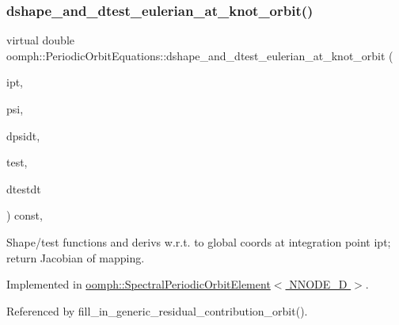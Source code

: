 \subsubsection{\texorpdfstring{dshape\+\_\+and\+\_\+dtest\+\_\+eulerian\+\_\+at\+\_\+knot\+\_\+orbit()}{dshape\_and\_dtest\_eulerian\_at\_knot\_orbit()}}
{\footnotesize\ttfamily virtual double oomph\+::\+Periodic\+Orbit\+Equations\+::dshape\+\_\+and\+\_\+dtest\+\_\+eulerian\+\_\+at\+\_\+knot\+\_\+orbit (\begin{DoxyParamCaption}\item[{const unsigned \&}]{ipt,  }\item[{\hyperlink{classoomph_1_1Shape}{Shape} \&}]{psi,  }\item[{\hyperlink{classoomph_1_1DShape}{D\+Shape} \&}]{dpsidt,  }\item[{\hyperlink{classoomph_1_1Shape}{Shape} \&}]{test,  }\item[{\hyperlink{classoomph_1_1DShape}{D\+Shape} \&}]{dtestdt }\end{DoxyParamCaption}) const\hspace{0.3cm}{\ttfamily [protected]}, {}}



Shape/test functions and derivs w.\+r.\+t. to global coords at integration point ipt; return Jacobian of mapping. 



Implemented in \hyperlink{classoomph_1_1SpectralPeriodicOrbitElement_a0468d601cfa2cda0a7fc3312575bb252}{oomph\+::\+Spectral\+Periodic\+Orbit\+Element$<$ N\+N\+O\+D\+E\+\_\+D $>$}.



Referenced by fill\+\_\+in\+\_\+generic\+\_\+residual\+\_\+contribution\+\_\+orbit().

\mbox{\label{classoomph_1_1PeriodicOrbitEquations_a745c25bf4dc333322bc9b4c1841ec11e}} 
